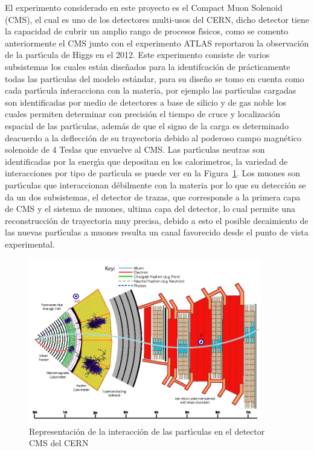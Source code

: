 El experimento considerado en este proyecto es el Compact Muon Solenoid (CMS), el cual es uno de los detectores multi-usos del CERN, dicho detector tiene la capacidad de cubrir un amplio rango de procesos f\'{\i}sicos, como se comento anteriormente el CMS junto con el experimento ATLAS reportaron la observaci\'on de la part\'{\i}cula de Higgs en el 2012.  Este experimento consiste de varios subsistemas los cuales est\'an dise\~nados para la identifcaci\'on de pr\'acticamente todas las part\'{\i}culas del modelo est\'andar, para su dise\~no se tomo en cuenta como cada part\'{\i}cula interacciona con la materia, por ejemplo las part\'{\i}culas cargadas son identificadas por medio de detectores a base de silicio y de gas noble los cuales permiten determinar con precisi\'on el tiempo de cruce y localizaci\'on espacial de las part\'{\i}culas, adem\'as de que el signo de la carga es determinado deacuerdo a la deflecci\'on de su trayectoria debido al poderoso campo magn\'etico solenoide de 4 Teslas que envuelve al CMS.  Las part\'{\i}culas neutras son identificadas por la energ\'{\i}a que depositan en los calorimetros, la variedad de interacciones por tipo de part\'{\i}cula se puede ver en la Figura~\ref{fig:cms_interaction}. Los muones son part\'{\i}culas que interaccionan d\'ebilmente con la materia por lo que su detecci\'on se da un dos subsistemas, el detector de trazas, que corresponde a la primera capa de CMS y el sistema de muones, ultima capa del detector, lo cual permite una reconstrucci\'on de trayectoria muy precisa, debido a esto el posible decaimiento de las nuevas part\'{\i}culas a muones resulta un canal favorecido desde el punto de vista experimental.


\begin{figure}
\begin{center}
 \includegraphics[width=4.0in]{cms_interaction.png}
  \caption{Representaci\'on de la interacci\'on de las part\'{\i}culas en el detector CMS del CERN}
 \label{fig:cms_interaction}
 \end{center}
\end{figure}


